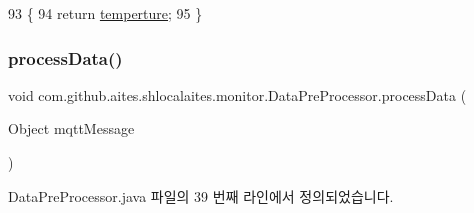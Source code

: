 \begin{DoxyCode}
93                                  \{
94          \textcolor{keywordflow}{return} \mbox{\hyperlink{classcom_1_1github_1_1aites_1_1shlocalaites_1_1monitor_1_1_data_pre_processor_a130f82de42bf7738d4aef7fa8390fee8}{temperture}};
95     \}
\end{DoxyCode}
\mbox{\label{classcom_1_1github_1_1aites_1_1shlocalaites_1_1monitor_1_1_data_pre_processor_a6eef68822e1d6a647dc174495d19e437}} 
\subsubsection{\texorpdfstring{process\+Data()}{processData()}}
{\footnotesize\ttfamily void com.\+github.\+aites.\+shlocalaites.\+monitor.\+Data\+Pre\+Processor.\+process\+Data (\begin{DoxyParamCaption}\item[{Object}]{mqtt\+Message }\end{DoxyParamCaption})}



Data\+Pre\+Processor.\+java 파일의 39 번째 라인에서 정의되었습니다.


